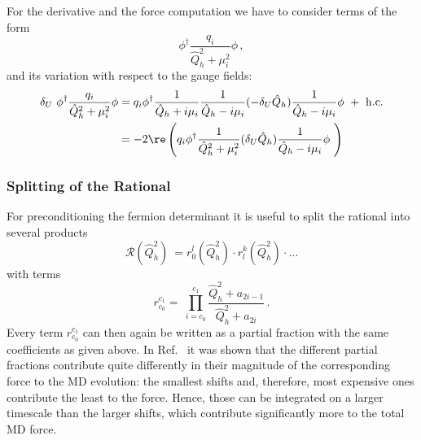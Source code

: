 For the derivative and the force computation we have to consider terms
of the form
\[      
\phi^\dagger \frac{q_i}{\hat Q_h^2 + \mu_i^2}\phi\,,
\]
and its variation with respect to the gauge fields:
\[      
\begin{split}   
\delta_U\  \phi^\dagger \frac{q_i}{\hat Q_h^2 + \mu_i^2}\phi &=
q_i\phi^\dagger\frac{1}{\hat Q_h + i\mu_i}\frac{1}{\hat Q_h -
i\mu_i}(-\delta_U \hat Q_h)\frac{1}{\hat Q_h -i\mu_i}\phi\ +\
\textrm{h.c.}\\
&= -2 \re\left( q_i\phi^\dagger\frac{1}{\hat Q_h^2 + \mu_i^2}
(\delta_U \hat Q_h)\frac{1}{\hat Q_h -i\mu_i}\phi\ \right)
\end{split}
\]

\subsubsection{Splitting of the Rational}

For preconditioning the fermion determinant it is useful to split the
rational into several products
\[
\mathcal{R}(\hat Q_h^2)\ = r_{0}^{l}(\hat Q_h^2)\cdot r_{l}^{k}(\hat
Q_h^2)\cdot ...
\]
with terms
\[
r_{c_0}^{c_1} = \ \prod_{i = c_0}^{c_1} \frac{\hat Q_h^2 +
  a_{2i-1}}{\hat Q_h^2 + a_{2i}}\,.
\]
Every term $r_{c_0}^{c_1}$ can then again be written as a partial
fraction with the same coefficients as given above. In
Ref.~\cite{Clark:2006fx} it was shown that the different partial 
fractions contribute quite differently in their magnitude of the
corresponding force to the MD evolution: the smallest shifts and,
therefore, most expensive ones contribute the least to the
force. Hence, those can be integrated on a larger timescale than the
larger shifts, which contribute significantly more to the total MD
force.
